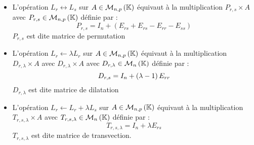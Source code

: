 \begin{defprop}
    \begin{itemize}
        \item L’opération \(L_r \leftrightarrow L_s\) sur \(A \in \mathcal{M}_{n,p}\left(\mathbb{K}\right)\) équivaut à la multiplication \(P_{r,s} \times A\) avec \(P_{r,s} \in \mathcal{M}_{n,p}\left(\mathbb{K}\right)\) définie par :
        \[P_{r,s} = I_n +(E_{rs} + E_{rs} - E_{rr}-E_{ss})\]
        \(P_{r,s}\) est dite matrice de permutation
        \item L'opération \(L_r \leftarrow \lambda L_r\) sur \(A \in \mathcal{M}_{n,p}\left(\mathbb{K}\right)\) équivaut à la multiplication \(D_{r,\lambda} \times A\) avec \(D_{r,\lambda} \times A\) avec \(D_{r,\lambda} \in \mathcal{M}_n\left(\mathbb{K}\right)\) définie par : 
        \[D_{r,s} = I_n + \left(\lambda - 1\right)E_{rr}\]
        \(D_{r,\lambda}\) est dite matrice de dilatation
        \item L'opération \(L_r \leftarrow L_r + \lambda L_s\) sur \(A\in \mathcal{M}_{n,p}\left(\mathbb{K}\right)\) équivaut à la multiplication \(T_{r,s,\lambda} \times A \) avec \(T_{r,s,\lambda} \in \mathcal{M}_n\left(\mathbb{K}\right)\) définie par :
        \[T_{r,s,\lambda} = I_n + \lambda E_{rs}\]
        \(T_{r,s,\lambda} \) est dite matrice de transvection.
    \end{itemize}
\end{defprop}

